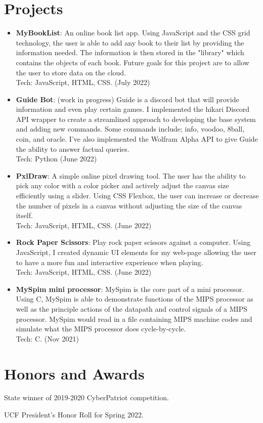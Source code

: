 \documentclass[a4paper,20pt]{article}
\newcommand{\resumeItem}[2]{
  \item\normalsize{
    \textbf{#1}{: #2 \vspace{1pt}}
  }
}
\newcommand{\resumeSubItem}[2]{\resumeItem{#1}{#2}\vspace{1pt}}
\newcommand{\resumeSubHeadingListStart}{\begin{itemize}[leftmargin=*]}
\newcommand{\resumeSubHeadingListEnd}{\end{itemize}}
\begin{document}
    \section{Projects}
        \resumeSubHeadingListStart
            \resumeSubItem{MyBookList}{An online book list app. Using JavaScript and the CSS grid technology, the user is able to add any book to their list by providing the information needed. The information is then stored in the "library" which contains the objects of each book. Future goals for this project are to allow the user to store data on the cloud.\\Tech: JavaScript, HTML, CSS. (July 2022)}
            \resumeSubItem{Guide Bot}{(work in progress) Guide is a discord bot that will provide information and even play certain games. I implemented the hikari Discord API wrapper to create a streamlined approach to developing the base system and adding new commands. Some commands include; info, voodoo, 8ball, coin, and oracle. I've also implemented the Wolfram Alpha API to give Guide the ability to answer factual queries.\\Tech: Python (June 2022)}
            \resumeSubItem{PxlDraw}{A simple online pixel drawing tool. The user has the ability to pick any color with a color picker and actively adjust the canvas size efficiently using a slider. Using CSS Flexbox, the user can increase or decrease the number of pixels in a canvas without adjusting the size of the canvas itself.\\Tech: JavaScript, HTML, CSS. (June 2022)}
            \resumeSubItem{Rock Paper Scissors}{Play rock paper scissors against a computer. Using JavaScript, I created dynamic UI elements for my web-page allowing the user to have a more fun and interactive experience when playing.\\Tech: JavaScript, HTML, CSS. (June 2022)}
            \resumeSubItem{MySpim mini processor}{MySpim is the core part of a mini processor. Using C, MySpim is able to demonstrate functions of the MIPS processor as well as the principle actions of the datapath and control signals of a MIPS processor. MySpim would read in a file containing MIPS machine codes and simulate what the MIPS processor does cycle-by-cycle.\\Tech: C. (Nov 2021)}
            \vspace{2pt}
        \resumeSubHeadingListEnd
    
    
    \section{Honors and Awards}
        \begin{description}[font=$\bullet$]
            \item {State winner of 2019-2020 CyberPatriot competition.}
            \item {UCF President's Honor Roll for Spring 2022.}
        \end{description}
        
\end{document}
